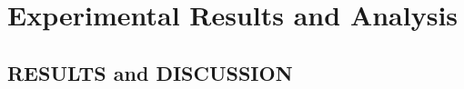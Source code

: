 \documentclass[12pt]{book} %
\begin{document}












\chapter{Experimental Results and Analysis}






\section{RESULTS and DISCUSSION}
\end{document}
